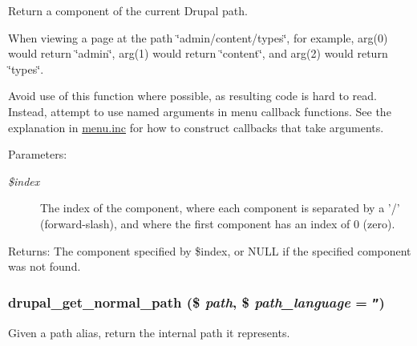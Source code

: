 Return a component of the current Drupal path.

When viewing a page at the path \char`\"{}admin/content/types\char`\"{}, for example, arg(0) would return \char`\"{}admin\char`\"{}, arg(1) would return \char`\"{}content\char`\"{}, and arg(2) would return \char`\"{}types\char`\"{}.

Avoid use of this function where possible, as resulting code is hard to read. Instead, attempt to use named arguments in menu callback functions. See the explanation in \hyperlink{menu_8inc}{menu.inc} for how to construct callbacks that take arguments.

\begin{Desc}
\item[Parameters:]
\begin{description}
\item[{\em \$index}]The index of the component, where each component is separated by a '/' (forward-slash), and where the first component has an index of 0 (zero).\end{description}
\end{Desc}
\begin{Desc}
\item[Returns:]The component specified by \$index, or NULL if the specified component was not found. \end{Desc}
\hypertarget{path_8inc_2f403630c5d004dd8d9936f46a1bb4cb}{
\subsubsection[{drupal\_\-get\_\-normal\_\-path}]{\setlength{\rightskip}{0pt plus 5cm}drupal\_\-get\_\-normal\_\-path (\$ {\em path}, \/  \$ {\em path\_\-language} = {\tt ''})}}
\label{path_8inc_2f403630c5d004dd8d9936f46a1bb4cb}


Given a path alias, return the internal path it represents.

